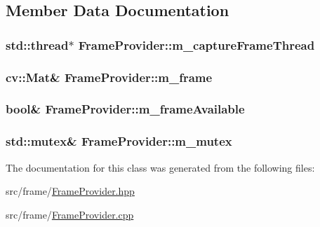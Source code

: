 \subsection{Member Data Documentation}
\subsubsection[{\texorpdfstring{m\+\_\+capture\+Frame\+Thread}{m_captureFrameThread}}]{\setlength{\rightskip}{0pt plus 5cm}std\+::thread$\ast$ Frame\+Provider\+::m\+\_\+capture\+Frame\+Thread\hspace{0.3cm}{\ttfamily [private]}}\hypertarget{classFrameProvider_a08d38afae37b22f5c0117bdc950d83b4}{}\label{classFrameProvider_a08d38afae37b22f5c0117bdc950d83b4}
\subsubsection[{\texorpdfstring{m\+\_\+frame}{m_frame}}]{\setlength{\rightskip}{0pt plus 5cm}cv\+::\+Mat\& Frame\+Provider\+::m\+\_\+frame\hspace{0.3cm}{\ttfamily [private]}}\hypertarget{classFrameProvider_afc074a4806d6406cbb395f98494a2172}{}\label{classFrameProvider_afc074a4806d6406cbb395f98494a2172}
\subsubsection[{\texorpdfstring{m\+\_\+frame\+Available}{m_frameAvailable}}]{\setlength{\rightskip}{0pt plus 5cm}bool\& Frame\+Provider\+::m\+\_\+frame\+Available\hspace{0.3cm}{\ttfamily [private]}}\hypertarget{classFrameProvider_a46df01a978cd8d56cd4ffafb676d8a44}{}\label{classFrameProvider_a46df01a978cd8d56cd4ffafb676d8a44}
\subsubsection[{\texorpdfstring{m\+\_\+mutex}{m_mutex}}]{\setlength{\rightskip}{0pt plus 5cm}std\+::mutex\& Frame\+Provider\+::m\+\_\+mutex\hspace{0.3cm}{\ttfamily [private]}}\hypertarget{classFrameProvider_a613fbc156614a7936ef4e05d8c9b0219}{}\label{classFrameProvider_a613fbc156614a7936ef4e05d8c9b0219}


The documentation for this class was generated from the following files\+:\begin{DoxyCompactItemize}
\item 
src/frame/\hyperlink{FrameProvider_8hpp}{Frame\+Provider.\+hpp}\item 
src/frame/\hyperlink{FrameProvider_8cpp}{Frame\+Provider.\+cpp}\end{DoxyCompactItemize}
